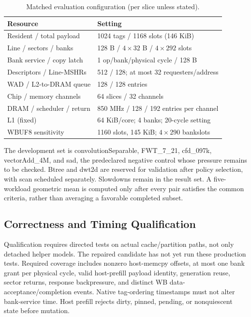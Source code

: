 \documentclass[conference,letterpaper]{IEEEtran}
\begin{document}
\begin{table}[t]
\caption{Matched evaluation configuration (per slice unless stated).}
\label{tab:configuration}\centering\footnotesize
\begin{tabularx}{\columnwidth}{@{}L{.42\columnwidth}X@{}}
\toprule
Resource & Setting \\
\midrule
Resident / total payload & 1024 tags / 1168 slots (146 KiB) \\
Line / sectors / banks & 128 B / $4\times32$ B / $4\times292$ slots \\
Bank service / copy latch & 1 op/bank/physical cycle / 128 B \\
Descriptors / Line-MSHRs & 512 / 128; at most 32 requesters/address \\
WAD / L2-to-DRAM queue & 128 / 128 entries \\
Chip / memory channels & 64 slices / 32 channels \\
DRAM / scheduler / return & 850 MHz / 128 / 192 entries per channel \\
L1 (fixed) & 64 KiB/core; 4 banks; 20-cycle setting \\
WBUF8 sensitivity & 1160 slots, 145 KiB; $4\times290$ bankslots \\
\bottomrule
\end{tabularx}
\end{table}

The development set is convolutionSeparable, FWT\_7\_21, cfd\_097k, vectorAdd\_4M, and sad, the predeclared negative control whose pressure remains to be checked. Btree and dwt2d are reserved for validation after policy selection, with scan scheduled separately. Slowdowns remain in the result set. A five-workload geometric mean is computed only after every pair satisfies the common criteria, rather than averaging a favorable completed subset.

\subsection{Correctness and Timing Qualification}
Qualification requires directed tests on actual cache/partition paths, not only detached helper models. The repaired candidate has not yet run these production tests. Required coverage includes nonzero host-memcpy offsets, at most one bank grant per physical cycle, valid host-prefill payload identity, generation reuse, sector returns, response backpressure, and distinct WB data-acceptance/completion events. Native tag-ordering timestamps must not alter bank-service time. Host prefill rejects dirty, pinned, pending, or nonquiescent state before mutation.
\end{document}
